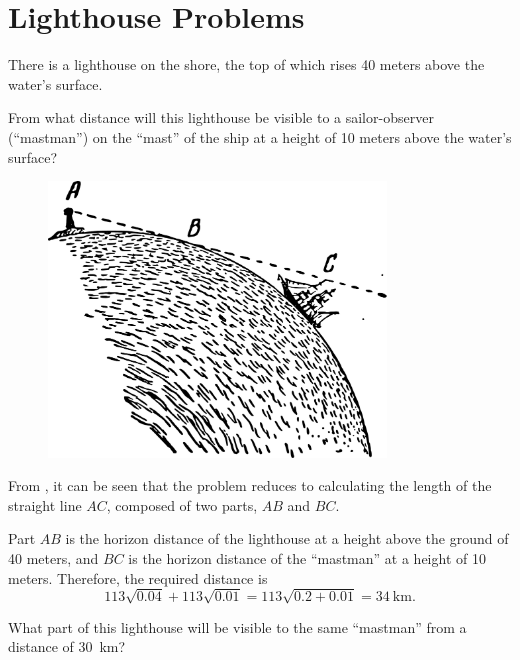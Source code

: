 \section{Lighthouse Problems}
\label{sec-6.7}



\ques There is a lighthouse on the shore, the top of which rises 40 meters above the water's surface.

From what distance will this lighthouse be visible to a sailor-observer (``mastman'') on the ``mast'' of the ship at a height of 10 meters above the water's surface?


\begin{figure}[h!]
\centering
\includegraphics[width=0.8\textwidth]{figures/ch-06/fig-105.pdf}
\end{figure}



\ans From , it can be seen that the problem reduces to calculating the length of the straight line $AC$, composed of two parts, $AB$ and $BC$.

Part $AB$ is the horizon distance of the lighthouse at a height above the ground of 40 meters, and $BC$ is the horizon distance of the ``mastman'' at a height of 10 meters. Therefore, the required distance is
\begin{equation*}%
113 \sqrt{0.04} + 113 \sqrt{0.01} = 113\sqrt{0.2 + 0.01} = \SI{34}{\kilo\meter}.
\end{equation*}

\ques What part of this lighthouse will be visible to the same ``mastman'' from a distance of \SI{30}{\kilo\meter}?


